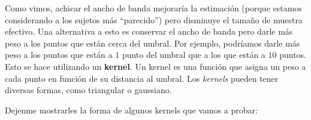 \documentclass[
  letterpaper,
  DIV=11,
  numbers=noendperiod,
  oneside]{scrreprt}
\begin{document}
Como vimos, achicar el ancho de banda mejoraría la estimación (porque
estamos considerando a los sujetos más ``parecido'') pero disminuye el
tamaño de muestra efectivo. Una alternativa a esto es conservar el ancho
de banda pero darle más peso a los puntos que están cerca del umbral.
Por ejemplo, podríamos darle más peso a los puntos que están a \(1\)
punto del umbral que a los que están a \(10\) puntos. Esto se hace
utilizando un \textbf{kernel}. Un kernel es una función que asigna un
peso a cada punto en función de su distancia al umbral. Los
\emph{kernels} pueden tener diversas formas, como triangular o
gaussiano.

Dejenme mostrarles la forma de algunos kernels que vamos a probar:
\end{document}
